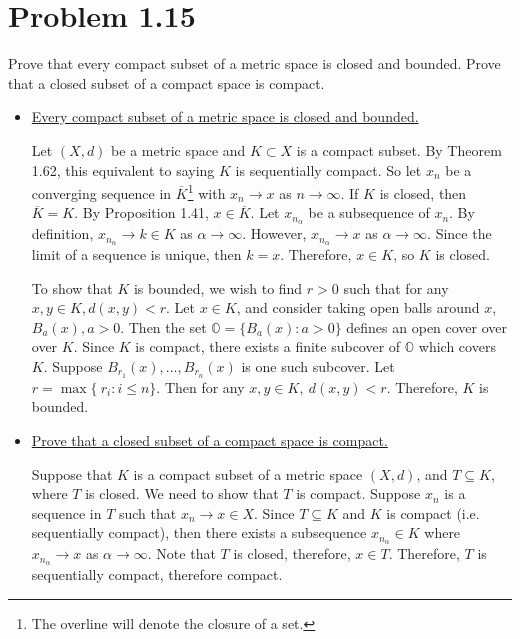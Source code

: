 \section{Problem 1.15}
Prove that every compact subset of a metric space is closed and bounded. Prove that a closed subset of a compact space is compact. 
\partbreak
\begin{solution}

    \begin{itemize}[-]
        \item \underline{Every compact subset of a metric space is closed and bounded.}

        \jump
        Let $(X, d)$ be a metric space and $K \subset X$ is a compact subset. By Theorem 1.62, this equivalent to saying $K$ is sequentially compact. So let $x_n$ be a converging sequence in $\overline{K}$\footnote{The overline will denote the closure of a set.} with $x_n \rightarrow x$ as $n \rightarrow \infty$. If $K$ is closed, then $\overline{K} = K$. By Proposition 1.41, $x \in \overline{K}$. Let $x_{n_\alpha}$ be a subsequence of $x_n$. By definition, $x_{n_\alpha} \rightarrow k \in K$ as $\alpha \rightarrow \infty$. However, $x_{n_\alpha} \rightarrow x$ as $\alpha \rightarrow \infty$. Since the limit of a sequence is unique, then $k = x$. Therefore, $x \in K$, so $K$ is closed.

        \jump
        To show that $K$ is bounded, we wish to find $r > 0$ such that for any $x, y \in K, d(x, y) < r$. Let $x \in K$, and consider taking open balls around $x$, $B_a(x), a > 0$. Then the set $ \mathbb{O} = \{ B_a(x) : a > 0 \} $ defines an open cover over over $K$. Since $K$ is compact, there exists a finite subcover of $\mathbb{O}$ which covers $K$. Suppose $B_{r_1}(x), ... , B_{r_n}(x)$ is one such subcover. Let $r = \max \{ \ r_i : i \leq n \}$. Then for any $x, y \in K, \  d(x, y) < r$. Therefore, $K$ is bounded. 

        \item \underline{Prove that a closed subset of a compact space is compact.}

        \jump
        Suppose that $K$ is a compact subset of a metric space $(X, d)$, and $T \subseteq K$, where $T$ is closed. We need to show that $T$ is compact. Suppose $x_n$ is a sequence in $T$ such that $x_n \rightarrow x \in X$. Since $T \subseteq K$ and $K$ is compact (i.e. sequentially compact), then there exists a subsequence $x_{n_\alpha} \in K$ where $x_{n_\alpha} \rightarrow x$ as $\alpha \rightarrow \infty$. Note that $T$ is closed, therefore, $x \in T$. Therefore, $T$ is sequentially compact, therefore compact.    
    \end{itemize}
    
\end{solution}

